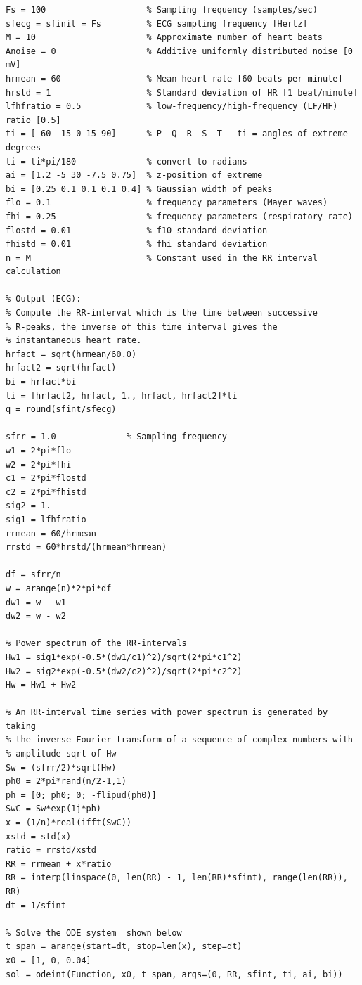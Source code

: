 \documentclass[paper=a4, fontsize=11pt]{scrartcl}
\numberwithin{equation}{section}		%
\numberwithin{figure}{section}			%
\numberwithin{table}{section}		    %
\begin{document}
\lstset{language=Matlab}
\begin{lstlisting}[frame=single, caption={ECG Pseudo Code}, label=ecg_code1]
% Inputs:
Fs = 100                    % Sampling frequency (samples/sec)
sfecg = sfinit = Fs         % ECG sampling frequency [Hertz]
M = 10                      % Approximate number of heart beats
Anoise = 0                  % Additive uniformly distributed noise [0 mV]
hrmean = 60                 % Mean heart rate [60 beats per minute]
hrstd = 1                   % Standard deviation of HR [1 beat/minute]
lfhfratio = 0.5             % low-frequency/high-frequency (LF/HF) ratio [0.5]
ti = [-60 -15 0 15 90]      % P  Q  R  S  T   ti = angles of extreme degrees
ti = ti*pi/180              % convert to radians
ai = [1.2 -5 30 -7.5 0.75]  % z-position of extreme 
bi = [0.25 0.1 0.1 0.1 0.4] % Gaussian width of peaks 
flo = 0.1                   % frequency parameters (Mayer waves)
fhi = 0.25                  % frequency parameters (respiratory rate)
flostd = 0.01               % f10 standard deviation  
fhistd = 0.01               % fhi standard deviation  
n = M                       % Constant used in the RR interval calculation 

% Output (ECG): 
% Compute the RR-interval which is the time between successive 
% R-peaks, the inverse of this time interval gives the 
% instantaneous heart rate.
hrfact = sqrt(hrmean/60.0)
hrfact2 = sqrt(hrfact)
bi = hrfact*bi
ti = [hrfact2, hrfact, 1., hrfact, hrfact2]*ti
q = round(sfint/sfecg)

sfrr = 1.0  			% Sampling frequency
w1 = 2*pi*flo
w2 = 2*pi*fhi
c1 = 2*pi*flostd
c2 = 2*pi*fhistd
sig2 = 1.
sig1 = lfhfratio
rrmean = 60/hrmean
rrstd = 60*hrstd/(hrmean*hrmean)

df = sfrr/n
w = arange(n)*2*pi*df
dw1 = w - w1
dw2 = w - w2

% Power spectrum of the RR-intervals
Hw1 = sig1*exp(-0.5*(dw1/c1)^2)/sqrt(2*pi*c1^2)
Hw2 = sig2*exp(-0.5*(dw2/c2)^2)/sqrt(2*pi*c2^2)
Hw = Hw1 + Hw2

% An RR-interval time series with power spectrum is generated by taking 
% the inverse Fourier transform of a sequence of complex numbers with 
% amplitude sqrt of Hw
Sw = (sfrr/2)*sqrt(Hw)
ph0 = 2*pi*rand(n/2-1,1)
ph = [0; ph0; 0; -flipud(ph0)]
SwC = Sw*exp(1j*ph)
x = (1/n)*real(ifft(SwC))  
xstd = std(x)
ratio = rrstd/xstd
RR = rrmean + x*ratio
RR = interp(linspace(0, len(RR) - 1, len(RR)*sfint), range(len(RR)), RR)
dt = 1/sfint

% Solve the ODE system  shown below 
t_span = arange(start=dt, stop=len(x), step=dt)  
x0 = [1, 0, 0.04]
sol = odeint(Function, x0, t_span, args=(0, RR, sfint, ti, ai, bi))
\end{lstlisting}
\end{document}
